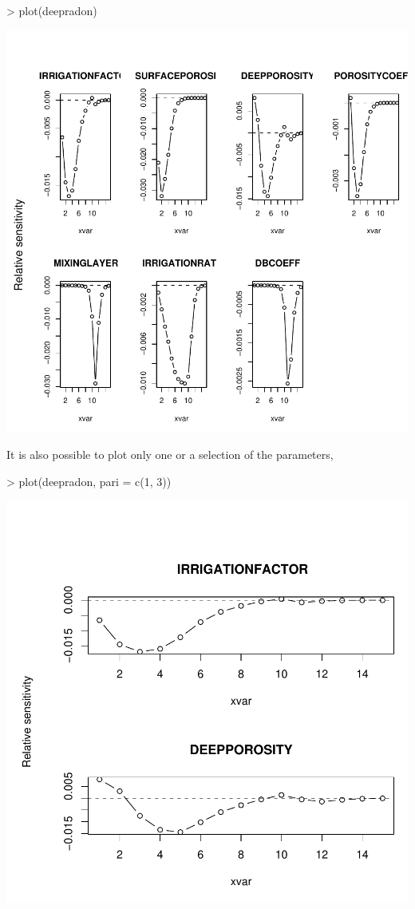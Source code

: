 \documentclass{scrartcl}
\begin{document}
\begin{Schunk}
\begin{Sinput}
> plot(deepradon)
\end{Sinput}
\end{Schunk}
\includegraphics{figures/f-022}

It is also possible to plot only one or a selection of the parameters,

\begin{Schunk}
\begin{Sinput}
> plot(deepradon, pari = c(1, 3))
\end{Sinput}
\end{Schunk}
\includegraphics{figures/f-023}
\end{document}
